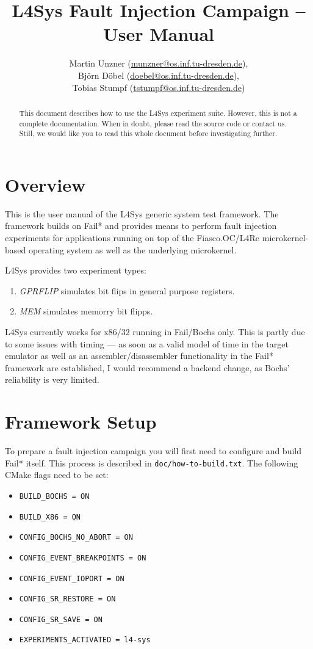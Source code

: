 \documentclass[a4paper,times,9pt]{article}
\title{L4Sys Fault Injection Campaign -- User Manual}
\author{Martin Unzner (\href{mailto:munzner@os.inf.tu-dresden.de}{munzner@os.inf.tu-dresden.de}), \\
        Björn Döbel (\href{mailto:doebel@os.inf.tu-dresden.de}{doebel@os.inf.tu-dresden.de}), \\   
        Tobias Stumpf (\href{mailto:tstumpf@os.inf.tu-dresden.de}{tstumpf@os.inf.tu-dresden.de})}
\newcommand{\lfs}{L4Sys}
\begin{document}
\maketitle

\begin{abstract}
This document describes how to use the L4Sys experiment suite.
However, this is not a complete documentation. When in doubt,
please read the source code or contact us. Still, we would like
you to read this whole document before investigating further.
\end{abstract}

\section{Overview}

This is the user manual of the \lfs{} generic system test framework.
The framework builds on Fail* and provides means to perform fault injection
experiments for applications running on top of the Fiasco.OC/L4Re
microkernel-based operating system as well as the underlying microkernel.

\noindent \lfs{} provides two experiment types:
\begin{enumerate}[topsep=0em,itemsep=0em]
  \item \emph{GPRFLIP} simulates bit flips in general purpose registers.
  \item \emph{MEM} simulates memorry bit flipps.
\end{enumerate}

\noindent \lfs{} currently works for x86/32 running in Fail/Bochs only.
This is partly due to some issues with timing --- as soon as a valid model of
time in the target emulator as well as an assembler/disassembler functionality
in the Fail* framework are established, I would recommend a backend change, as
Bochs' reliability is very limited.

\section{Framework Setup}

To prepare a fault injection campaign you will first need to configure and
build Fail* itself. This process is described in \texttt{doc/how-to-build.txt}.
The following CMake flags need to be set:

\begin{itemize}[itemsep=0em]
\item \verb+BUILD_BOCHS = ON+
\item \verb+BUILD_X86 = ON+
\item \verb+CONFIG_BOCHS_NO_ABORT = ON+
\item \verb+CONFIG_EVENT_BREAKPOINTS = ON+
\item \verb+CONFIG_EVENT_IOPORT = ON+
\item \verb+CONFIG_SR_RESTORE = ON+
\item \verb+CONFIG_SR_SAVE = ON+
\item \verb+EXPERIMENTS_ACTIVATED = l4-sys+
\end{itemize}
\end{document}
